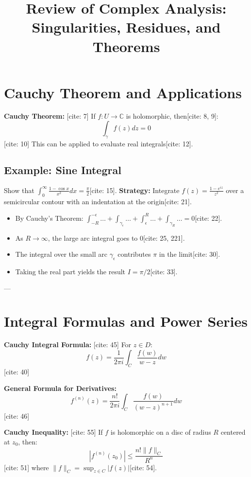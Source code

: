 \documentclass[11pt]{article}
\title{Review of Complex Analysis: Singularities, Residues, and Theorems}
\date{}
\begin{document}
\maketitle

\section{Cauchy Theorem and Applications}

\textbf{Cauchy Theorem:} [cite: 7]
If $f: U \rightarrow \mathbb{C}$ is holomorphic, then[cite: 8, 9]:
$$\int_{\gamma} f(z) dz = 0$$ [cite: 10]
This can be applied to evaluate real integrals[cite: 12].

\subsection*{Example: Sine Integral}
Show that $\int_{0}^{\infty} \frac{1-\cos x}{x^{2}} dx = \frac{\pi}{2}$[cite: 15].
\textbf{Strategy:} Integrate $f(z) = \frac{1-e^{iz}}{z^{2}}$ over a semicircular contour with an indentation at the origin[cite: 21].
\begin{itemize}
    \item By Cauchy's Theorem: $\int_{-R}^{-\epsilon} \dots + \int_{\gamma_{\epsilon}} \dots + \int_{\epsilon}^{R} \dots + \int_{\gamma_{R}} \dots = 0$[cite: 22].
    \item As $R \to \infty$, the large arc integral goes to 0[cite: 25, 221].
    \item The integral over the small arc $\gamma_{\epsilon}$ contributes $\pi$ in the limit[cite: 30].
    \item Taking the real part yields the result $I = \pi/2$[cite: 33].
\end{itemize}

---

\section{Integral Formulas and Power Series}

\textbf{Cauchy Integral Formula:} [cite: 45]
For $z \in D$:
$$f(z) = \frac{1}{2\pi i} \int_{C} \frac{f(w)}{w-z} dw$$ [cite: 40]

\textbf{General Formula for Derivatives:}
$$f^{(n)}(z) = \frac{n!}{2\pi i} \int_{C} \frac{f(w)}{(w-z)^{n+1}} dw$$ [cite: 46]

\textbf{Cauchy Inequality:} [cite: 55]
If $f$ is holomorphic on a disc of radius $R$ centered at $z_0$, then:
$$|f^{(n)}(z_0)| \le \frac{n! \|f\|_C}{R^n}$$ [cite: 51]
where $\|f\|_C = \sup_{z \in C} |f(z)|$[cite: 54].
\end{document}
